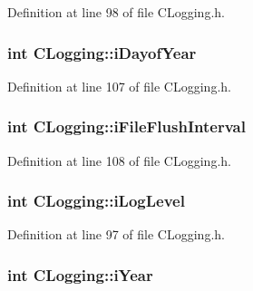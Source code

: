 \-Definition at line 98 of file \-C\-Logging.\-h.

\hypertarget{class_c_logging_a3d64ed55288a13595ba440fb6356e7c2}{
\subsubsection[{i\-Dayof\-Year}]{\setlength{\rightskip}{0pt plus 5cm}int {\bf \-C\-Logging\-::i\-Dayof\-Year}}}\label{class_c_logging_a3d64ed55288a13595ba440fb6356e7c2}


\-Definition at line 107 of file \-C\-Logging.\-h.

\hypertarget{class_c_logging_adf8e82a334654b6875f81decf6c0306b}{
\subsubsection[{i\-File\-Flush\-Interval}]{\setlength{\rightskip}{0pt plus 5cm}int {\bf \-C\-Logging\-::i\-File\-Flush\-Interval}}}\label{class_c_logging_adf8e82a334654b6875f81decf6c0306b}


\-Definition at line 108 of file \-C\-Logging.\-h.

\hypertarget{class_c_logging_a672993d47c795a8ab994447f926f4159}{
\subsubsection[{i\-Log\-Level}]{\setlength{\rightskip}{0pt plus 5cm}int {\bf \-C\-Logging\-::i\-Log\-Level}}}\label{class_c_logging_a672993d47c795a8ab994447f926f4159}


\-Definition at line 97 of file \-C\-Logging.\-h.

\hypertarget{class_c_logging_a6ebd771a621ebcf2a621f99de27134bf}{
\subsubsection[{i\-Year}]{\setlength{\rightskip}{0pt plus 5cm}int {\bf \-C\-Logging\-::i\-Year}}}\label{class_c_logging_a6ebd771a621ebcf2a621f99de27134bf}


